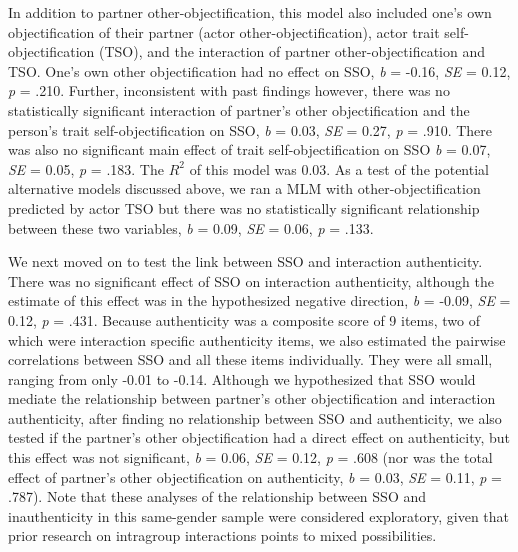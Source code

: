\documentclass[man]{apa6}
\begin{document}
In addition to partner other-objectification, this model also included
one's own objectification of their partner (actor
other-objectification), actor trait self-objectification (TSO), and the
interaction of partner other-objectification and TSO. One's own other
objectification had no effect on SSO, \emph{b} = -0.16, \emph{SE} =
0.12, \emph{p} = .210. Further, inconsistent with past findings however,
there was no statistically significant interaction of partner's other
objectification and the person's trait self-objectification on SSO,
\emph{b} = 0.03, \emph{SE} = 0.27, \emph{p} = .910. There was also no
significant main effect of trait self-objectification on SSO \emph{b} =
0.07, \emph{SE} = 0.05, \emph{p} = .183. The \(R^2\) of this model was
0.03. As a test of the potential alternative models discussed above, we
ran a MLM with other-objectification predicted by actor TSO but there
was no statistically significant relationship between these two
variables, \emph{b} = 0.09, \emph{SE} = 0.06, \emph{p} = .133.

We next moved on to test the link between SSO and interaction
authenticity. There was no significant effect of SSO on interaction
authenticity, although the estimate of this effect was in the
hypothesized negative direction, \emph{b} = -0.09, \emph{SE} = 0.12,
\emph{p} = .431. Because authenticity was a composite score of 9 items,
two of which were interaction specific authenticity items, we also
estimated the pairwise correlations between SSO and all these items
individually. They were all small, ranging from only -0.01 to -0.14.
Although we hypothesized that SSO would mediate the relationship between
partner's other objectification and interaction authenticity, after
finding no relationship between SSO and authenticity, we also tested if
the partner's other objectification had a direct effect on authenticity,
but this effect was not significant, \emph{b} = 0.06, \emph{SE} = 0.12,
\emph{p} = .608 (nor was the total effect of partner's other
objectification on authenticity, \emph{b} = 0.03, \emph{SE} = 0.11,
\emph{p} = .787). Note that these analyses of the relationship between
SSO and inauthenticity in this same-gender sample were considered
exploratory, given that prior research on intragroup interactions points
to mixed possibilities.
\end{document}
